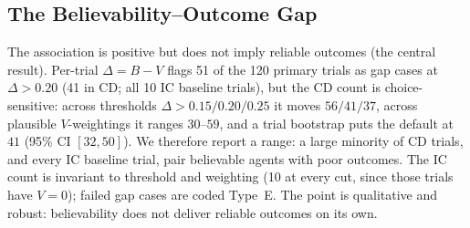 \documentclass[runningheads]{llncs}
\begin{document}
\subsection{The Believability--Outcome Gap}\label{sec:results-gap}
The association is positive but does not imply reliable outcomes (the central result). Per-trial $\Delta = B - V$ flags 51 of the 120 primary trials as gap cases at $\Delta > 0.20$ (41 in CD; all 10 IC baseline trials), but the CD count is choice-sensitive: across thresholds $\Delta > 0.15/0.20/0.25$ it moves $56/41/37$, across plausible $V$-weightings it ranges $30$--$59$, and a trial bootstrap puts the default at $41$ (95\% CI $[32,50]$). We therefore report a range: a large minority of CD trials, and every IC baseline trial, pair believable agents with poor outcomes. The IC count is invariant to threshold and weighting (10 at every cut, since those trials have $V=0$); failed gap cases are coded Type~E. The point is qualitative and robust: believability does not deliver reliable outcomes on its own.
\end{document}
